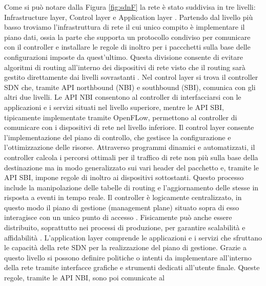 \newline Come si può notare dalla Figura \ref{fig:sdnF} la rete è stato suddivisa in tre livelli: Infrastructure layer, Control layer e Application layer \cite{sdnlayers}.
\newline Partendo dal livello più basso troviamo l'infrastruttura di rete il cui unico compito è implementare il piano dati, ossia la parte che supporta un protocollo condiviso per comunicare con il controller e installare le regole di inoltro
per i paccchetti sulla base delle configurazioni imposte da quest'ultimo. 
Questa divisione consente di evitare algoritmi
di routing all'interno dei dispositivi di rete visto che il routing sarà
gestito direttamente dai livelli sovrastanti \cite{tesiSDN:2017}. 
\newline Nel control layer si trova il controller SDN che, tramite API northbound (NBI) e southbound (SBI), comunica con
gli altri due livelli. Le API NBI consentono al controller di interfacciarsi con le applicazioni e i servizi situati nel livello superiore,
mentre le API SBI, tipicamente implementate tramite OpenFLow, permettono al controller di comunicare con i dispositivi di rete nel livello inferiore.
\newline Il control layer consente l'implementazione del piano di controllo, che gestisce la configurazione e l'ottimizzazione delle risorse. 
Attraverso programmi dinamici e automatizzati, il controller calcola i percorsi ottimali per il traffico di rete non più sulla base della destinazione ma in modo generalizzato sui vari header del pacchetto e, tramite le API SBI, impone regole di inoltro ai dispositivi sottostanti. 
Questo processo include la manipolazione delle tabelle di routing e l'aggiornamento delle stesse in risposta a eventi in tempo reale.
\newline Il controller è logicamente centralizzato, in questo modo il piano di gestione (management plane) situato sopra di esso interagisce con un
unico punto di accesso \cite{tesiSDN:2020}. Fisicamente può anche essere distribuito, soprattutto nei processi di produzione, per garantire scalabilità e affidabilità \cite{sdnlayers}.
\newline L'application layer comprende le applicazioni e i servizi che sfruttano le capacità della
rete SDN per la realizzazione del piano di gestione. Grazie a questo livello si possono
definire politiche o intenti da implementare all'interno della rete tramite interfacce grafiche e strumenti dedicati all'utente finale.
Queste regole, tramite le API NBI, sono poi comunicate al
